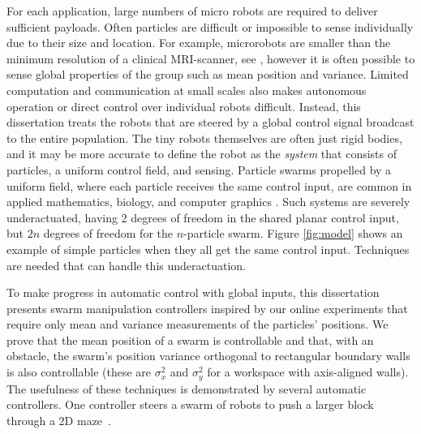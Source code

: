  For each application, large numbers of micro robots are required  to deliver sufficient payloads.
 Often particles are difficult or impossible to sense individually due to their size and location. 
For example, microrobots are smaller than the minimum resolution of a clinical MRI-scanner, see \cite{martel2014computer}, however it is often possible to sense global properties of the group such as mean position and variance. 
 Limited computation and communication at small scales also makes autonomous operation or direct control over individual robots difficult. 
  Instead, this dissertation treats the robots that are steered by a global control signal broadcast to the entire population. 
  The tiny robots themselves are often just rigid bodies, and it may be more accurate to define the robot as the \emph{system} that consists of particles, a uniform control field, and sensing.
 Particle swarms propelled by a uniform field, where each particle  receives the same control input, are common in applied mathematics, biology, and computer graphics \cite{Peyer2013,Shirai2005,Chiang2011}. 
Such systems are severely underactuated, having 2 degrees of freedom in the shared planar control input, but $2n$ degrees of freedom for the $n$-particle swarm. Figure \ref{fig:model} shows an example of simple particles when they all get the same control input.
 Techniques are needed that can handle this underactuation.  
 
 To make progress in automatic control with global inputs, this dissertation presents swarm manipulation controllers inspired by our online experiments that require only mean and variance measurements of the particles' positions. 
We prove that the mean position of a swarm is controllable and that, with an obstacle, the swarm's position variance orthogonal to rectangular boundary walls  is also controllable
(these are $\sigma_x^2$ and $\sigma_y^2$ for a workspace with axis-aligned walls). 
The usefulness of these techniques is demonstrated by several automatic controllers. One controller steers a swarm of robots to push a larger block through a 2D maze~\cite{ShahrokhiIROS2015}. 

